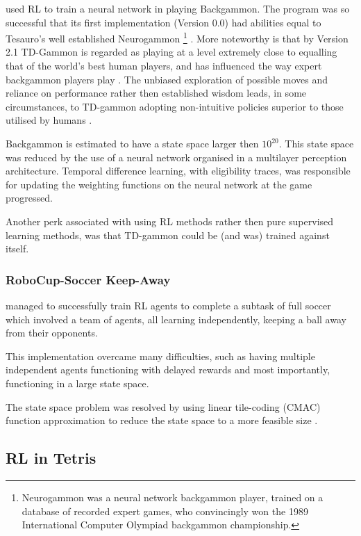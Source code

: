\documentclass{rucsthesis}
\begin{document}
 \cite{tdgammon} used RL to train a neural network in playing Backgammon. The program was so successful that its first implementation (Version 0.0) had abilities equal to Tesauro's well established Neurogammon \footnote{Neurogammon was a neural network backgammon player, trained on a database of recorded expert games, who convincingly won the 1989 International Computer Olympiad backgammon championship.} \citep{tdgammon}.  More noteworthy is that by Version 2.1 TD-Gammon is regarded as playing at a level extremely close to equalling that of the world's best human players, and has influenced the way expert backgammon players play \citep{tdgammon}. The unbiased exploration of possible moves and reliance on performance rather then established wisdom leads, in some circumstances, to TD-gammon adopting non-intuitive policies superior to those utilised by humans \citep{tdgammon}.

Backgammon is estimated to have a state space larger then $10^{20}$. This state space was reduced by the use of a neural network organised in a multilayer perception architecture. Temporal difference learning, with eligibility traces, was responsible for updating the weighting functions on the neural network at the game progressed. 

Another perk associated with using RL methods rather then pure supervised learning methods, was that TD-gammon could be (and was) trained against itself\citep{tdgammon}.

\subsubsection{RoboCup-Soccer Keep-Away}

\cite{keepaway} managed to successfully train RL agents to complete a subtask of full soccer which involved a team of agents, all learning independently, keeping a ball away from their opponents. 

This implementation overcame many difficulties, such as having multiple independent agents functioning with delayed rewards and most importantly, functioning in a large state space. 

The state space problem was resolved by using linear tile-coding (CMAC) function approximation to reduce the state space to a more feasible size \citep{keepaway}.

\subsection{RL in Tetris}
\end{document}
